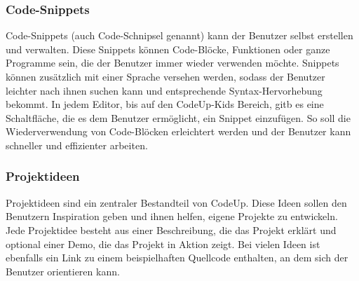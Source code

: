 \documentclass[main.tex]{subfiles}
\begin{document}
    \subsubsection{Code-Snippets}
    Code-Snippets (auch Code-Schnipsel genannt) kann der Benutzer selbst erstellen und verwalten.
    Diese Snippets können Code-Blöcke, Funktionen oder ganze Programme sein, die der Benutzer immer wieder verwenden möchte.
    Snippets können zusätzlich mit einer Sprache versehen werden, sodass der Benutzer leichter nach ihnen suchen kann und entsprechende Syntax-Hervorhebung bekommt.
    In jedem Editor, bis auf den CodeUp-Kids Bereich, gitb es eine Schaltfläche, die es dem Benutzer ermöglicht, ein Snippet einzufügen.
    So soll die Wiederverwendung von Code-Blöcken erleichtert werden und der Benutzer kann schneller und effizienter arbeiten.
    \subsubsection{Projektideen}
    Projektideen sind ein zentraler Bestandteil von CodeUp.
    Diese Ideen sollen den Benutzern Inspiration geben und ihnen helfen, eigene Projekte zu entwickeln.
    Jede Projektidee besteht aus einer Beschreibung, die das Projekt erklärt und optional einer Demo, die das Projekt in Aktion zeigt.
    Bei vielen Ideen ist ebenfalls ein Link zu einem beispielhaften Quellcode enthalten, an dem sich der Benutzer orientieren kann.
\end{document}
